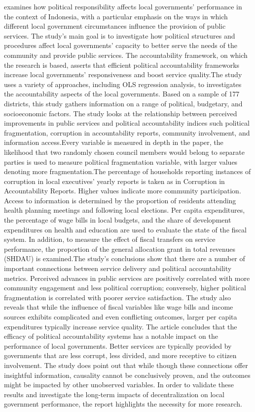   examines how political responsibility affects local governments' performance in the context of Indonesia, with a particular emphasis on the ways in which different local government circumstances influence the provision of public services. The study's main goal is to investigate how political structures and procedures affect local governments' capacity to better serve the needs of the community and provide public services. The accountability framework, on which the research is based, asserts that efficient political accountability frameworks increase local governments' responsiveness and boost service quality.The study uses a variety of approaches, including OLS regression analysis, to investigates the accountability aspects of the local governments. Based on a sample of 177 districts, this study gathers information on a range of political, budgetary, and socioeconomic factors. The study looks at the relationship between perceived improvements in public services and political accountability indices such political fragmentation, corruption in accountability reports, community involvement, and information access.Every variable is measured in depth in the paper, the likelihood that two randomly chosen council members would belong to separate parties is used to measure political fragmentation variable, with larger values denoting more fragmentation.The percentage of households reporting instances of corruption in local executives' yearly reports is taken as in Corruption in Accountability Reports. Higher values indicate more community participation. Access to information is determined by the proportion of residents attending health planning meetings and following local elections. Per capita expenditures, the percentage of wage bills in local budgets, and the share of development expenditures on health and education are used to evaluate the state of the fiscal system. In addition, to measure the effect of fiscal transfers on service performance, the proportion of the general allocation grant in total revenues (SHDAU) is examined.The study's conclusions show that there are a number of important connections between service delivery and political accountability metrics. Perceived advances in public services are positively correlated with more community engagement and less political corruption; conversely, higher political fragmentation is correlated with poorer service satisfaction. The study also reveals that while the influence of fiscal variables like wage bills and income sources exhibits complicated and even conflicting outcomes, larger per capita expenditures typically increase service quality. The article concludes that the efficacy of political accountability systems has a notable impact on the performance of local governments. Better services are typically provided by governments that are less corrupt, less divided, and more receptive to citizen involvement. The study does point out that while though these connections offer insightful information, causality cannot be conclusively proven, and the outcomes might be impacted by other unobserved variables. In order to validate these results and investigate the long-term impacts of decentralization on local government performance, the report highlights the necessity for more research.\par
